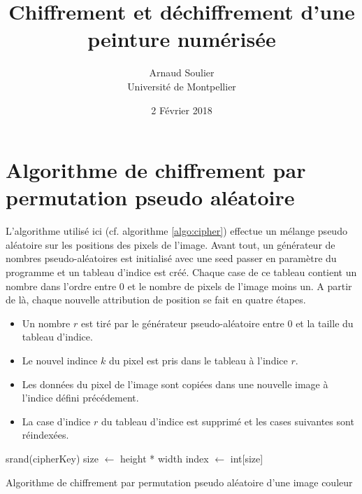 \documentclass[a4paper]{article}
\title{Chiffrement et déchiffrement d'une peinture numérisée}
\author{Arnaud Soulier\\Université de Montpellier}
\date{2 Février 2018}
\begin{document}
    \maketitle

    \section{Algorithme de chiffrement par permutation pseudo aléatoire}

        L'algorithme utilisé ici (cf. algorithme \ref{algo:cipher}) effectue un mélange pseudo aléatoire sur les positions des pixels de l'image. Avant tout, un générateur de nombres pseudo-aléatoires est initialisé avec une seed passer en paramètre du programme et un tableau d'indice est créé. Chaque case de ce tableau contient un nombre dans l'ordre entre 0 et le nombre de pixels de l'image moins un. A partir de là, chaque nouvelle attribution de position se fait en quatre étapes.
        \begin{itemize}
            \item Un nombre $r$ est tiré par le générateur pseudo-aléatoire entre 0 et la taille du tableau d'indice.
            \item Le nouvel indince $k$ du pixel est pris dans le tableau à l'indice $r$.
            \item Les données du pixel de l'image sont copiées dans une nouvelle image à l'indice défini précédement.
            \item La case d'indice $r$ du tableau d'indice est supprimé et les cases suivantes sont réindexées.
        \end{itemize}

        \begin{algorithm}[htbp]
            \SetAlgoLined
            srand(cipherKey)\;
            size $\leftarrow$ height * width\;
            index $\leftarrow$ int[size]\;
            \caption{Algorithme de chiffrement par permutation pseudo aléatoire d'une image couleur}
            \label{algo:cipher}
        \end{algorithm}
\end{document}
